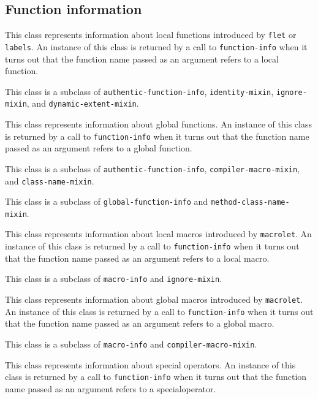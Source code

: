 \subsection{Function information}


This class represents information about local functions introduced by
\texttt{flet} or \texttt{labels}.  An instance of this class is
returned by a call to \texttt{function-info} when it turns out that
the function name passed as an argument refers to a local function.

This class is a subclass of \texttt{authentic-function-info},
\texttt{identity-mixin}, \texttt{ignore-mixin}, and \texttt{dynamic-extent-mixin}.


This class represents information about global functions.  An instance
of this class is returned by a call to \texttt{function-info} when it
turns out that the function name passed as an argument refers to a
global function.

This class is a subclass of \texttt{authentic-function-info},
\texttt{compiler-macro-mixin}, and \texttt{class-name-mixin}.


This class is a subclass of \texttt{global-function-info} and
\texttt{method-class-name-mixin}.



This class represents information about local macros introduced by
\texttt{macrolet}.  An instance of this class is returned by a call to
\texttt{function-info} when it turns out that the function name passed
as an argument refers to a local macro.

This class is a subclass of \texttt{macro-info} and \texttt{ignore-mixin}.


This class represents information about global macros introduced by
\texttt{macrolet}.  An instance of this class is returned by a call to
\texttt{function-info} when it turns out that the function name passed
as an argument refers to a global macro.

This class is a subclass of \texttt{macro-info} and \texttt{compiler-macro-mixin}.


This class represents information about special operators.  An
instance of this class is returned by a call to \texttt{function-info}
when it turns out that the function name passed as an argument refers
to a specialoperator.

